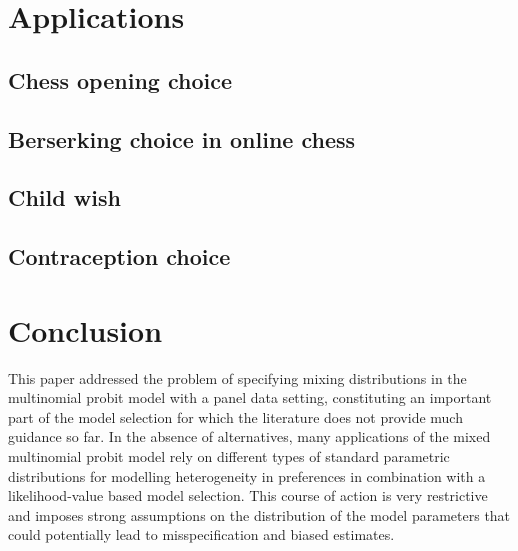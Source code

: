 \documentclass[article]{jss}
\begin{document}
\section{Applications} \label{sec:applications}


\subsection{Chess opening choice} \label{subsec:chess_opening_choice}

\subsection{Berserking choice in online chess} \label{subsec:berserk}

\subsection{Child wish} \label{subsec:child_wish}

\subsection{Contraception choice} \label{subsec:contraception_choice}


\section{Conclusion} \label{sec:conclusion}

This paper addressed the problem of specifying mixing distributions in the multinomial probit model with a panel data setting, constituting an important part of the model selection for which the literature does not provide much guidance so far. In the absence of alternatives, many applications of the mixed multinomial probit model rely on different types of standard parametric distributions for modelling heterogeneity in preferences in combination with a likelihood-value based model selection. This course of action is very restrictive and imposes strong assumptions on the distribution of the model parameters that could potentially lead to misspecification and biased estimates.
\end{document}
